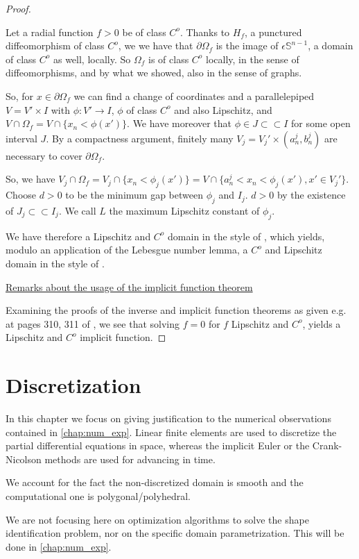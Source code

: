\documentclass[english,a4paper,9pt,oneside]{scrbook}	%
\theoremstyle{break}
\newenvironment{mproof}[1][\proofname]{%
  \begin{proof}[#1]$ $\par\nobreak\ignorespaces
}{%
  \end{proof}
}
\renewcommand*{\proofname}{Proof}
\theoremstyle{remark}
\newcommand{\mS}{\mathbb{S}^{n-1}}
\newcommand{\cc}{\subset\subset}
\newcommand{\eps}{\epsilon}
\begin{document}
\begin{mproof}
Let a radial function $f>0$ be of class $C^o$. Thanks to $H_f$, a punctured diffeomorphism of class $C^o$, we we have that $\partial \Omega_f$ is the image of $\eps\mS$, a domain of class $C^o$ as well, locally. So $\Omega_f $ is of class $C^o$ locally, in the sense of diffeomorphisms, and by what we showed, also in the sense of graphs.

So, for $x \in \partial \Omega_f$ we can find a change of coordinates and a parallelepiped $V = V'\times I$ with $\phi: V'\rightarrow I$, $\phi$ of class $C^o$ and also Lipschitz, and $V\cap 	\Omega_f = V\cap \{x_n<\phi(x')\}$. We have moreover that $\phi \in J \cc I$ for some open interval $J$. By a compactness argument, finitely many $V_j = V_j'\times (a_n^j, b_n^j) $ are necessary to cover $\partial \Omega_f$. 

So, we have $V_j \cap \Omega_f = V_j\cap \{x_n<\phi_j(x')\} = V\cap \{a_n^j<x_n<\phi_j(x'), x' \in V_j'\}$. Choose $d>0$ to be the minimum gap between $\phi_j$ and $I_j$. $d>0$ by the existence of $J_j \cc I_j$. We call $L$ the maximum Lipschitz constant of $\phi_j$. 

We have therefore a Lipschitz and $C^o$ domain in the style of \cite{burenkov}, which yields, modulo an application of the Lebesgue number lemma, a $C^o$ and Lipschitz domain in the style of \cite{grisvard}.

\underline{Remarks about the usage of the implicit function theorem}

Examining the proofs of the inverse and implicit function theorems as given e.g. at pages 310, 311 of \cite{gilardi2}, we see that solving $f=0$ for $f$ Lipschitz and $C^o$, yields a Lipschitz and $C^o$ implicit function.

\end{mproof}

\chapter{Discretization}

In this chapter we focus on giving justification to the numerical observations contained in \cref{chap:num_exp}. Linear finite elements are used to discretize the partial differential equations in space, whereas the implicit Euler or the Crank-Nicolson methods are used for advancing in time.

We account for the fact the non-discretized domain is smooth and the computational one is polygonal/polyhedral. 

We are not focusing here on optimization algorithms to solve the shape identification problem, nor on the specific domain parametrization. This will be done in \cref{chap:num_exp}.
\end{document}
